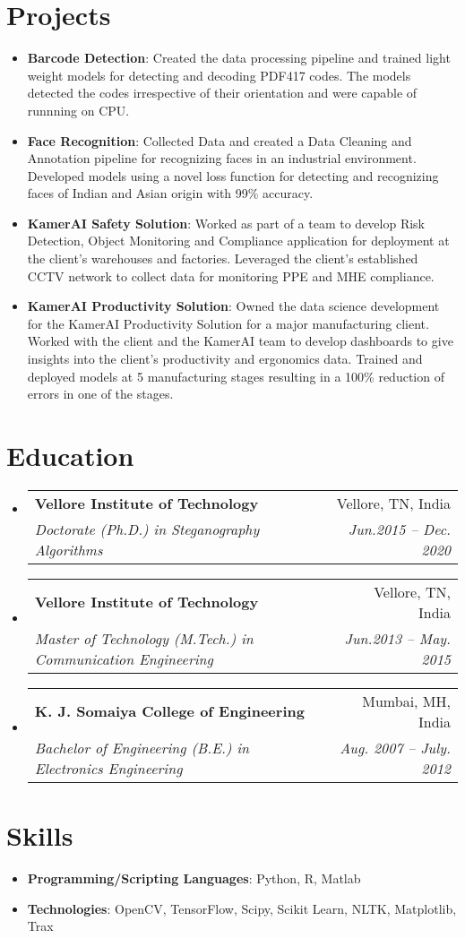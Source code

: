 \documentclass[a4paper,11pt]{article}
\makeatletter
\newcommand{\resumeItem}[2]{
  \item\small{
    \textbf{#1}{: #2 \vspace{-2pt}}
  }
}
\newcommand{\resumeSubheading}[4]{
  \vspace{-1pt}\item
    \begin{tabular*}{0.97\textwidth}[t]{l@{\extracolsep{\fill}}r}
      \textbf{#1} & #2 \\
      \textit{\small#3} & \textit{\small #4} \\
    \end{tabular*}\vspace{-5pt}
}
\newcommand{\resumeSubItem}[2]{\resumeItem{#1}{#2}\vspace{-4pt}}
\newcommand{\resumeSubHeadingListStart}{\begin{itemize}[leftmargin=*]}
\newcommand{\resumeSubHeadingListEnd}{\end{itemize}}
\newcommand{\resumeItemListStart}{\begin{itemize}}
\newcommand{\resumeItemListEnd}{\end{itemize}\vspace{-5pt}}
\makeatother
\begin{document}
\section{Projects}
  \resumeItemListStart
    \resumeSubItem{Barcode Detection}
      {Created the data processing pipeline and trained light weight models for detecting and decoding PDF417 codes. The models detected the codes irrespective of their orientation and were capable of runnning on CPU.}
      
    \resumeSubItem{Face Recognition}
      {Collected Data and created a Data Cleaning and Annotation pipeline for recognizing faces in an industrial environment. Developed models using a novel loss function for detecting and recognizing faces of Indian and Asian origin with 99\% accuracy.}

    \resumeSubItem{KamerAI Safety Solution}
      {Worked as part of a team to develop Risk Detection, Object Monitoring and Compliance application for deployment at the client's warehouses and factories. Leveraged the client's established CCTV network to collect data for monitoring PPE and MHE compliance.}
    
      \resumeSubItem{KamerAI Productivity Solution}
      {Owned the data science development for the KamerAI Productivity Solution for a major manufacturing client. Worked with the client and the KamerAI team to develop dashboards to give insights into the client's productivity and ergonomics data. Trained and deployed models at 5 manufacturing stages resulting in a 100\% reduction of errors in one of the stages.}
  \resumeItemListEnd

\section{Education}
  \resumeSubHeadingListStart
    \resumeSubheading
      {Vellore Institute of Technology}{Vellore, TN, India}
      {Doctorate (Ph.D.) in Steganography Algorithms}{Jun.2015 -- Dec. 2020}
     \resumeSubheading
      {Vellore Institute of Technology}{Vellore, TN, India}
      {Master of Technology (M.Tech.) in Communication Engineering}{Jun.2013 -- May. 2015}
    \resumeSubheading
      {K. J. Somaiya College of Engineering}{Mumbai, MH, India}
      {Bachelor of Engineering (B.E.) in Electronics Engineering}{Aug. 2007 -- July. 2012}
  \resumeSubHeadingListEnd

\section{Skills}
	\begin{itemize}[leftmargin=*, itemsep = -4pt]
		\item{\textbf{Programming/Scripting Languages}{: Python, R, Matlab}}
		\item{\textbf{Technologies}{: OpenCV, TensorFlow, Scipy, Scikit Learn, NLTK, Matplotlib, Trax}}
	\end{itemize}
\end{document}
